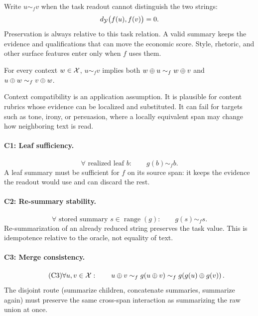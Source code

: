 Write $u\sim_f v$ when the task readout cannot distinguish the two strings:
\[
  d_{\mathcal{Y}}\big(f(u),f(v)\big)=0.
\]
Preservation is always relative to this task relation. A valid summary keeps
the evidence and qualifications that can move the economic score. Style,
rhetoric, and other surface features enter only when $f$ uses them.

\begin{assumption}\label{ass:context}
For every context $w\in\mathcal{X}$, $u\sim_f v$ implies both
$w\oplus u\sim_f w\oplus v$ and
$u\oplus w\sim_f v\oplus w$.
\end{assumption}

Context compatibility is an application assumption. It is plausible for
content rubrics whose evidence can be localized and substituted. It can fail
for targets such as tone, irony, or persuasion, where a locally equivalent span
may change how neighboring text is read.

\paragraph{C1: Leaf sufficiency.}
\begin{equation*}\tag{C1}
  \forall\text{ realized leaf }b:\qquad g(b)\sim_f b.
\end{equation*}
A leaf summary must be sufficient for $f$ on its source span: it keeps the
evidence the readout would use and can discard the rest.

\paragraph{C2: Re-summary stability.}
\begin{equation*}\tag{C2}
  \forall\text{ stored summary }s\in\operatorname{range}(g):\qquad
  g(s)\sim_f s.
\end{equation*}
Re-summarization of an already reduced string preserves the task value. This
is idempotence relative to the oracle, not equality of text.

\paragraph{C3: Merge consistency.}
\begin{equation*}\tag{C3}
  \forall u,v\in\mathcal{X}:\qquad
  u\oplus v
  \sim_f g(u\oplus v)
  \sim_f g\!\left(g(u)\oplus g(v)\right).
\end{equation*}
The disjoint route (summarize children, concatenate summaries, summarize
again) must preserve the same cross-span interaction as summarizing the raw
union at once.

